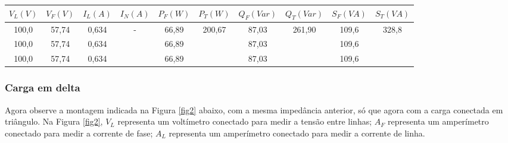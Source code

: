 \documentclass[a4paper,12pt,oneside,openany,table,xcdraw]{article}
\begin{document}
\begin{table}[H]\scriptsize
\centering
\def\arraystretch{1.35}
\captionsetup{font=scriptsize}
 \label{tab4}

\begin{tabular}{|c|c|c|c|c|c|c|c|c|c|}
\hline
$V_{L} (V)$ & $V_{F} (V)$ & $I_{L} (A)$ & $I_{N} (A)$        & $P_{F} (W)$ & $P_{T} (W)$             & $Q_{F} (Var)$ & $Q_{T} (Var)$           & $S_{F} (VA)$ & $S_{T} (VA)$           \\ \hline
100,0       & 57,74          & 0,634       & \multirow{3}{*}{-} & 66,89       & \multirow{3}{*}{200,67} & 87,03         & \multirow{3}{*}{261,90} & 109,6        & \multirow{3}{*}{328,8} \\ \cline{1-3} \cline{5-5} \cline{7-7} \cline{9-9}
100,0       & 57,74          & 0,634       &                    & 66,89       &                         & 87,03         &                         & 109,6        &                        \\ \cline{1-3} \cline{5-5} \cline{7-7} \cline{9-9}
100,0       & 57,74          & 0,634       &                    & 66,89       &                         & 87,03         &                         & 109,6        &                        \\ \hline
\end{tabular}
\end{table}

\subsubsection{Carga em delta}
Agora observe a montagem indicada na Figura \ref{fig2} abaixo, com a mesma
impedância anterior, só que agora com a carga conectada em triângulo. Na Figura \ref{fig2}, $V_L$
representa um voltímetro conectado para medir a tensão entre linhas; $A_F$ representa um
amperímetro conectado para medir a corrente de fase; $A_L$ representa um amperímetro
conectado para medir a corrente de linha.
\end{document}
